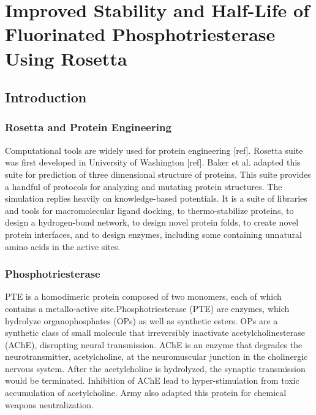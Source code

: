 \chapter{Improved Stability and Half-Life of Fluorinated Phosphotriesterase Using Rosetta}
\label{chap:rosetta}
\begin{refsection}

\section{Introduction}

\subsection{Rosetta and Protein Engineering}

\label{sec:rosetta}

Computational tools are widely used for protein engineering [ref]. Rosetta
suite was first developed in University of Washington [ref]. Baker et al.
adapted this suite for prediction of three dimensional structure of proteins.
This suite provides a handful of protocols for analyzing and mutating protein
structures. The simulation replies heavily on knowledge-based potentials. It is
a suite of libraries and tools for macromolecular ligand docking, to
thermo-stabilize proteins, to design a hydrogen-bond network, to design novel
protein folds, to create novel protein interfaces, and to design enzymes,
including some containing unnatural amino acids in the active sites. 

\subsection{Phosphotriesterase}
\label{sec:pte}

PTE is a homodimeric protein composed of two monomers, each of which contains a
metallo-active site.Phosphotriesterase (PTE) are enzymes, which hydrolyze
organophosphates (OPs) as well as synthetic esters.\cite{Ghanem2005a} OPs are a
synthetic class of small molecule that irreversibly inactivate
acetylcholinesterase (AChE), disrupting neural transmission. AChE is an enzyme
that degrades the neurotransmitter, acetylcholine, at the neuromuscular
junction in the cholinergic nervous system. After the acetylcholine is
hydrolyzed, the synaptic transmission would be terminated. Inhibition of AChE
lead to hyper-stimulation from toxic accumulation of
acetylcholine.\cite{Soreq2001} Army also adapted this protein for chemical
weapons neutralization. \cite{Yang2014a}


\end{refsection}
